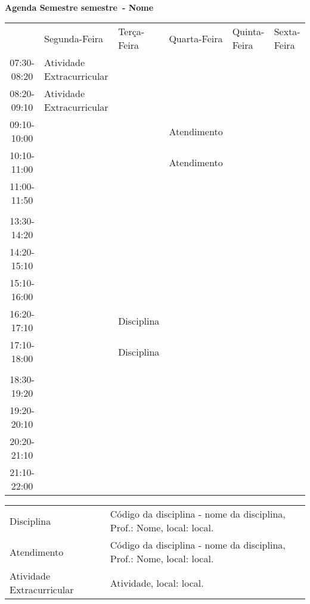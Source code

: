 \documentclass[a4paper,12pt,landscape]{article}
\newcommand{\semestre}{semestre}
\newcommand{\usuario}{Nome}
\begin{document}
	{\ } \vfill
	\begin{center}
		{\huge \bf Agenda Semestre \semestre\ - \usuario}
	\end{center}

	\vfill
	\begin{table}[H]
		\centering
		\begin{spacing}{1.25}
			\begin{tabular}{cC{47mm}C{47mm}C{47mm}C{47mm}C{47mm}}
				\toprule
				& Segunda-Feira & Terça-Feira & Quarta-Feira & Quinta-Feira & Sexta-Feira \\
				07:30-08:20& Atividade Extracurricular & & & & \\
				08:20-09:10& Atividade Extracurricular & & & & \\
				09:10-10:00& & & Atendimento & & \\
				10:10-11:00& & & Atendimento & & \\
				11:00-11:50& & & & & \\
				& & & & & \\
				13:30-14:20& & & & & \\
				14:20-15:10& & & & & \\
				15:10-16:00& & & & & \\
				16:20-17:10& & Disciplina & & & \\
				17:10-18:00& & Disciplina & & & \\
				& & & & & \\
				18:30-19:20& & & & & \\
				19:20-20:10& & & & & \\
				20:20-21:10& & & & & \\
				21:10-22:00& & & & & \\
				\bottomrule
			\end{tabular}
		\end{spacing}
	\end{table}
	\vfill
	\begin{table}[H]
		\raggedright
		\begin{spacing}{1.25}
			\begin{tabular}{C{47mm}l}
				Disciplina& Código da disciplina - nome da disciplina, Prof.: Nome, local: local.\\
				Atendimento& Código da disciplina - nome da disciplina, Prof.: Nome, local: local.\\
				Atividade Extracurricular& Atividade, local: local.
			\end{tabular}
		\end{spacing}
	\end{table}
	\vfill
\end{document}
